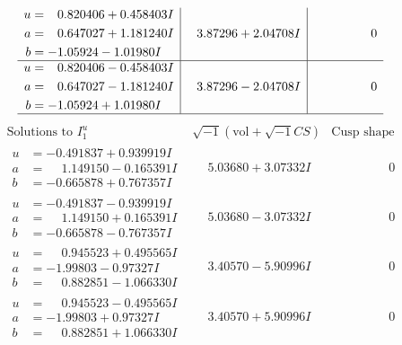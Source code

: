 \documentclass[1p]{elsarticle_modified}
\theoremstyle{definition}
\newcommand{\I}{\sqrt{-1}}
\begin{document}
$$\begin{array}{c|c|c}
\begin{aligned}
u &= \phantom{-}0.820406 + 0.458403 I \\
a &= \phantom{-}0.647027 + 1.181240 I \\
b &= -1.05924 - 1.01980 I\end{aligned}
 & \phantom{-}3.87296 + 2.04708 I & \phantom{-0.000000 } 0 \\ \hline\begin{aligned}
u &= \phantom{-}0.820406 - 0.458403 I \\
a &= \phantom{-}0.647027 - 1.181240 I \\
b &= -1.05924 + 1.01980 I\end{aligned}
 & \phantom{-}3.87296 - 2.04708 I & \phantom{-0.000000 } 0\\
 \hline 
 \end{array}$$\newpage$$\begin{array}{c|c|c}  
\text{Solutions to }I^u_{1}& \I (\text{vol} + \sqrt{-1}CS) & \text{Cusp shape}\\
 \hline 
\begin{aligned}
u &= -0.491837 + 0.939919 I \\
a &= \phantom{-}1.149150 - 0.165391 I \\
b &= -0.665878 + 0.767357 I\end{aligned}
 & \phantom{-}5.03680 + 3.07332 I & \phantom{-0.000000 } 0 \\ \hline\begin{aligned}
u &= -0.491837 - 0.939919 I \\
a &= \phantom{-}1.149150 + 0.165391 I \\
b &= -0.665878 - 0.767357 I\end{aligned}
 & \phantom{-}5.03680 - 3.07332 I & \phantom{-0.000000 } 0 \\ \hline\begin{aligned}
u &= \phantom{-}0.945523 + 0.495565 I \\
a &= -1.99803 - 0.97327 I \\
b &= \phantom{-}0.882851 - 1.066330 I\end{aligned}
 & \phantom{-}3.40570 - 5.90996 I & \phantom{-0.000000 } 0 \\ \hline\begin{aligned}
u &= \phantom{-}0.945523 - 0.495565 I \\
a &= -1.99803 + 0.97327 I \\
b &= \phantom{-}0.882851 + 1.066330 I\end{aligned}
 & \phantom{-}3.40570 + 5.90996 I & \phantom{-0.000000 } 0 \\ \hline\begin{aligned}

\end{aligned}
\end{array}$$
\end{document}
